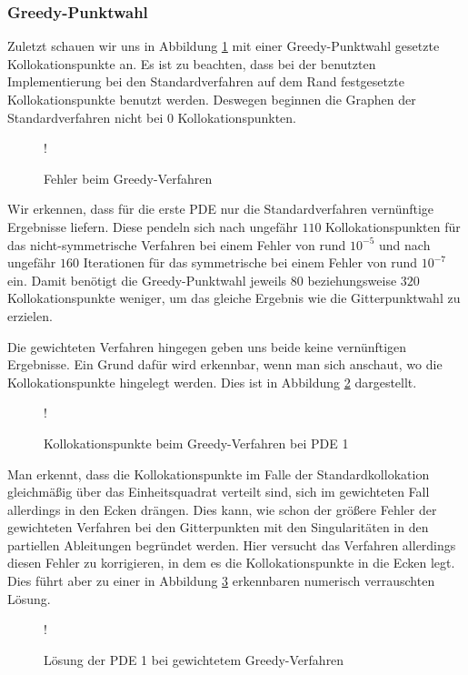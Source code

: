 \subsubsection{Greedy-Punktwahl}
Zuletzt schauen wir uns in Abbildung \ref{fig:error-greedy} mit einer Greedy-Punktwahl gesetzte Kollokationspunkte an. Es ist zu beachten, dass bei der benutzten Implementierung bei den Standardverfahren auf dem Rand festgesetzte Kollokationspunkte benutzt werden. Deswegen beginnen die Graphen der Standardverfahren nicht bei $0$ Kollokationspunkten.
\begin{figure}[ht]
\centering
\resizebox {\columnwidth} {!} {

}
\caption{Fehler beim Greedy-Verfahren}
\label{fig:error-greedy}
\end{figure}

Wir erkennen, dass für die erste \ac{PDE} nur die Standardverfahren vernünftige Ergebnisse liefern. Diese pendeln sich nach ungefähr $110$ Kollokationspunkten für das nicht-symmetrische Verfahren bei einem Fehler von rund $10^{-5}$ und nach ungefähr $160$ Iterationen für das symmetrische bei einem Fehler von rund $10^{-7}$ ein. Damit benötigt die Greedy-Punktwahl jeweils $80$ beziehungsweise $320$ Kollokationspunkte weniger, um das gleiche Ergebnis wie die Gitterpunktwahl zu erzielen.

Die gewichteten Verfahren hingegen geben uns beide keine vernünftigen Ergebnisse. Ein Grund dafür wird erkennbar, wenn man sich anschaut, wo die Kollokationspunkte hingelegt werden. Dies ist in Abbildung \ref{fig:greedy-points} dargestellt.
\begin{figure}[ht]
\centering
\resizebox {\columnwidth} {!} {

}
\caption{Kollokationspunkte beim Greedy-Verfahren bei \ac{PDE} 1}
\label{fig:greedy-points}
\end{figure}

Man erkennt, dass die Kollokationspunkte im Falle der Standardkollokation gleichmäßig über das Einheitsquadrat verteilt sind, sich im gewichteten Fall allerdings in den Ecken drängen. Dies kann, wie schon der größere Fehler der gewichteten Verfahren bei den Gitterpunkten mit den Singularitäten in den partiellen Ableitungen begründet werden. Hier versucht das Verfahren allerdings diesen Fehler zu korrigieren, in dem es die Kollokationspunkte in die Ecken legt. Dies führt aber zu einer in Abbildung \ref{fig:greedy-verrauscht} erkennbaren numerisch verrauschten Lösung. 

\begin{figure}[H]
\centering
\resizebox {\columnwidth} {!} {

}
\caption{Lösung der \ac{PDE} 1 bei gewichtetem Greedy-Verfahren}
\label{fig:greedy-verrauscht}
\end{figure}


